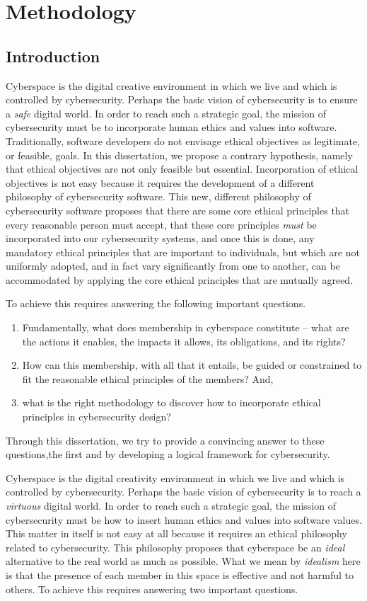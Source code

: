 \chapter{Methodology}
\section{Introduction} 
Cyberspace is the digital creative environment in which we live and which is controlled by cybersecurity. Perhaps the basic vision of cybersecurity is to ensure a \emph{safe} digital world. In order to reach such a strategic goal, the mission of cybersecurity must be to incorporate human ethics and values into software. Traditionally, software developers do not envisage ethical objectives as legitimate, or feasible, goals. In this dissertation, we propose a contrary hypothesis, namely that ethical objectives are not only feasible but essential. Incorporation of ethical objectives is not easy because it requires the development of a different philosophy of cybersecurity software.  This new, different philosophy of cybersecurity software proposes that there are some core ethical principles that every reasonable person must accept, that these core principles \emph{must} be incorporated into our cybersecurity systems, and once this is done, any mandatory ethical principles that are important to individuals, but which are not uniformly adopted, and in fact vary significantly from one to another, can be accommodated by applying the core ethical principles that are mutually agreed.  

To achieve this requires answering the following  important questions.

\begin{enumerate}
\item Fundamentally, what does membership in cyberspace constitute -- what are the actions it enables, the impacts it allows, its obligations, and its rights?
\item How can this membership, with all that it entails, be guided or constrained to fit the reasonable ethical principles of the members? And,
\item what is the right methodology to discover how to incorporate ethical principles in cybersecurity design?
\end{enumerate}

Through this dissertation, we try to provide a convincing answer to these  questions,the first and  by developing a logical framework for cybersecurity.

\iffalse
Cyberspace is the digital creativity environment in which we live and
which is controlled by cybersecurity.  Perhaps the basic vision of
cybersecurity is to reach a \emph{virtuous} digital world.  In order to
reach such a strategic goal, the mission of cybersecurity must be how
to insert human ethics and values into software values.  This matter
in itself is not easy at all because it requires an ethical philosophy
related to cybersecurity.  This philosophy proposes that cyberspace
be an \emph{ideal} alternative to the real world as much as possible.
What we mean by \emph{idealism} here is that the presence of each member
in this space is effective and not harmful to others.  To achieve this
requires answering two important questions.

